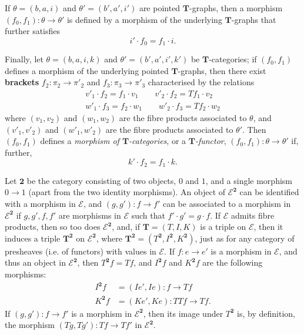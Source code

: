 \documentclass[fleqn]{article}
\newcommand{\oldpage}[1]{\marginpar{\footnotesize$\Big\vert$ \textit{p.~#1}}}
\newcommand{\unsure}[1]{{\color{purple}\textbf{#1}}}
\newcommand{\TT}{\mathbf{T}}
\newcommand{\cat}[1]{\mathcal{#1}}
\begin{document}
If $\theta=(b,a,i)$ and $\theta'=(b',a',i')$ are pointed $\TT$-graphs, then a morphism $(f_0,f_1)\colon\theta\to\theta'$ is defined by a morphism of the underlying $\TT$-graphs that further satisfies
\[
  i'\cdot f_0
  = f_1\cdot i.
  \tag{2'}
\]

\oldpage{228}
Finally, let $\theta=(b,a,i,k)$ and $\theta'=(b',a',i',k')$ be $\TT$-categories;
if $(f_0,f_1)$ defines a morphism of the underlying pointed $\TT$-graphs, then there exist \unsure{brackets} $f_2\colon\pi_2\to\pi'_2$ and $f_3\colon\pi_3\to\pi'_3$ characterised by the relations
\[
  \begin{gathered}
    v'_1\cdot f_2
    = f_1\cdot v_1
    \qquad
    v'_2\cdot f_2
    = Tf_1\cdot v_2
  \\w'_1\cdot f_3
    = f_2\cdot w_1
    \qquad
    w'_2\cdot f_3
    = T f_2\cdot w_2
  \end{gathered}
\]
where $(v_1,v_2)$ and $(w_1,w_2)$ are the fibre products associated to $\theta$, and $(v'_1,v'_2)$ and $(w'_1,w'_2)$ are the fibre products associated to $\theta'$.
Then $(f_0,f_1)$ defines a \emph{morphism of $\TT$-categories}, or a \emph{$\TT$-functor}, $(f_0,f_1)\colon\theta\to\theta'$ if, further,
\[
  k'\cdot f_2
  = f_1\cdot k.
  \tag{3'}
\]

Let $\mathbf{2}$ be the category consisting of two objects, $0$ and $1$, and a single morphism $0\to1$ (apart from the two identity morphisms).
An object of $\cat{E}^\mathbf{2}$ can be identified with a morphism in $\cat{E}$, and $(g,g')\colon f\to f'$ can be associated to a morphism in $\cat{E}^\mathbf{2}$ if $g,g',f,f'$ are morphisms in $\cat{E}$ such that $f'\cdot g'=g\cdot f$.
If $\cat{E}$ admits fibre products, then so too does $\cat{E}^\mathbf{2}$, and, if $\TT=(T,I,K)$ is a triple on $\cat{E}$, then it induces a triple $\TT^\mathbf{2}$ on $\cat{E}^\mathbf{2}$, where $\TT^\mathbf{2}=(T^\mathbf{2},I^\mathbf{2},K^\mathbf{2})$, just as for any category of presheaves (i.e. of functors) with values in $\cat{E}$.
If $f\colon e\to e'$ is a morphism in $\cat{E}$, and thus an object in $\cat{E}^\mathbf{2}$, then $T^\mathbf{2}f=Tf$, and $I^\mathbf{2}f$ and $K^\mathbf{2}f$ are the following morphisms:
\[
  \begin{aligned}
    I^\mathbf{2}f
    &= (Ie',Ie)
    \colon f
    \to Tf
  \\K^\mathbf{2}f
    &= (Ke', Ke)
    \colon TTf
    \to Tf.
  \end{aligned}
\]
If $(g,g')\colon f\to f'$ is a morphism in $\cat{E}^\mathbf{2}$, then its image under $T^\mathbf{2}$ is, by definition, the morphism $(Tg,Tg')\colon Tf\to Tf'$ in $\cat{E}^\mathbf{2}$.
\end{document}
